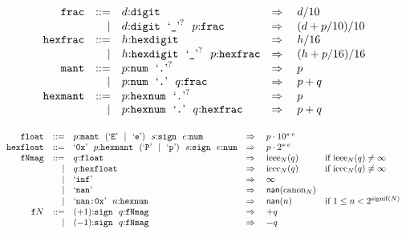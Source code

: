 \vspace{1ex}

$$
\begin{array}[t]{@{}lrrl@{}l@{}l@{}l@{}}
& {\mathtt{frac}} & ::= & d{:}{\mathtt{digit}} & \quad\Rightarrow\quad{} & d / 10 \\
& & | & d{:}{\mathtt{digit}}~~{\mbox{‘\texttt{\_}’}^?}~~p{:}{\mathtt{frac}} & \quad\Rightarrow\quad{} & (d + p / 10) / 10 \\
& {\mathtt{hexfrac}} & ::= & h{:}{\mathtt{hexdigit}} & \quad\Rightarrow\quad{} & h / 16 \\
& & | & h{:}{\mathtt{hexdigit}}~~{\mbox{‘\texttt{\_}’}^?}~~p{:}{\mathtt{hexfrac}} & \quad\Rightarrow\quad{} & (h + p / 16) / 16 \\
& {\mathtt{mant}} & ::= & p{:}{\mathtt{num}}~~{\mbox{‘\texttt{.}’}^?} & \quad\Rightarrow\quad{} & p \\
& & | & p{:}{\mathtt{num}}~~\mbox{‘\texttt{.}’}~~q{:}{\mathtt{frac}} & \quad\Rightarrow\quad{} & p + q \\
& {\mathtt{hexmant}} & ::= & p{:}{\mathtt{hexnum}}~~{\mbox{‘\texttt{.}’}^?} & \quad\Rightarrow\quad{} & p \\
& & | & p{:}{\mathtt{hexnum}}~~\mbox{‘\texttt{.}’}~~q{:}{\mathtt{hexfrac}} & \quad\Rightarrow\quad{} & p + q \\
\end{array}
$$

$$
\begin{array}[t]{@{}lrrl@{}l@{}l@{}l@{}}
& {\mathtt{float}} & ::= & p{:}{\mathtt{mant}}~~(\mbox{‘\texttt{E}’} ~~|~~ \mbox{‘\texttt{e}’})~~s{:}{\mathtt{sign}}~~e{:}{\mathtt{num}} & \quad\Rightarrow\quad{} & p \cdot {10^{s \cdot e}} \\
& {\mathtt{hexfloat}} & ::= & \mbox{‘\texttt{0x}’}~~p{:}{\mathtt{hexmant}}~~(\mbox{‘\texttt{P}’} ~~|~~ \mbox{‘\texttt{p}’})~~s{:}{\mathtt{sign}}~~e{:}{\mathtt{num}} & \quad\Rightarrow\quad{} & p \cdot {2^{s \cdot e}} \\
& {\mathtt{fNmag}} & ::= & q{:}{\mathtt{float}} & \quad\Rightarrow\quad{} & {{\mathrm{ieee}}}_{N}(q) & \quad \mbox{if}~ {{\mathrm{ieee}}}_{N}(q) \neq \infty \\
& & | & q{:}{\mathtt{hexfloat}} & \quad\Rightarrow\quad{} & {{\mathrm{ieee}}}_{N}(q) & \quad \mbox{if}~ {{\mathrm{ieee}}}_{N}(q) \neq \infty \\
& & | & \mbox{‘\texttt{inf}’} & \quad\Rightarrow\quad{} & \infty \\
& & | & \mbox{‘\texttt{nan}’} & \quad\Rightarrow\quad{} & {\mathsf{nan}}{({{\mathrm{canon}}}_{N})} \\
& & | & \mbox{‘\texttt{nan:0x}’}~~n{:}{\mathtt{hexnum}} & \quad\Rightarrow\quad{} & {\mathsf{nan}}{(n)} & \quad \mbox{if}~ 1 \leq n < {2^{{\mathrm{signif}}(N)}} \\
& {{\mathtt{f}}}{N} & ::= & ({+1}){:}{\mathtt{sign}}~~q{:}{\mathtt{fNmag}} & \quad\Rightarrow\quad{} & {+q} \\
& & | & ({-1}){:}{\mathtt{sign}}~~q{:}{\mathtt{fNmag}} & \quad\Rightarrow\quad{} & {-q} \\
\end{array}
$$

